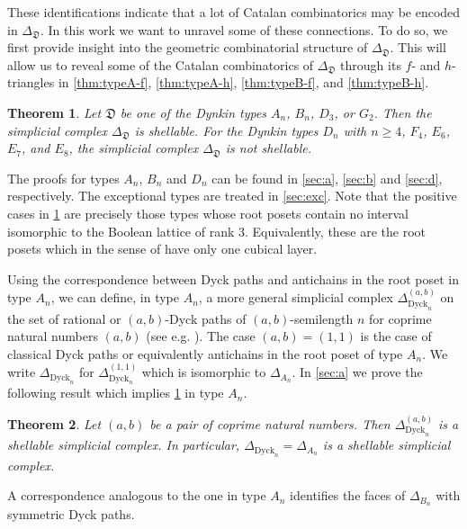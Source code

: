 \documentclass[11pt]{amsart}
\def\Dyck{\mathrm{Dyck}}
\def\fD{\mathfrak{D}}
\theoremstyle{plain}
\numberwithin{lemma}{\DefaultNumberTheoremWithin}
\newtheorem{theorem}{Theorem}
\numberwithin{theorem}{\DefaultNumberTheoremWithin}
\numberwithin{corollary}{\DefaultNumberTheoremWithin}
\numberwithin{proposition}{\DefaultNumberTheoremWithin}
\numberwithin{conjecture}{\DefaultNumberTheoremWithin}
\theoremstyle{definition}
\numberwithin{definition}{\DefaultNumberTheoremWithin}
\numberwithin{question}{\DefaultNumberTheoremWithin}
\numberwithin{problem}{\DefaultNumberTheoremWithin}
\theoremstyle{remark}
\numberwithin{remark}{\DefaultNumberTheoremWithin}
\numberwithin{example}{\DefaultNumberTheoremWithin}
\numberwithin{claim}{\DefaultNumberTheoremWithin}
\begin{document}
These identifications indicate that a lot of Catalan combinatorics may be encoded in $\Delta_\fD$.
In this work we want to unravel some of these connections.
To do so, we first provide insight into the geometric combinatorial structure of 
$\Delta_\fD$. This will allow us to reveal some of the Catalan combinatorics  of $\Delta_\fD$
through its $f$- and $h$-triangles in \ref{thm:typeA-f}, \ref{thm:typeA-h}, \ref{thm:typeB-f}, and \ref{thm:typeB-h}. 

\begin{theorem} \label{thm:antichain}
    Let $\fD$ be one of the Dynkin types $A_n$, $B_n$, $D_3$, or $G_2$. Then the simplicial complex $\Delta_\fD$ is shellable. For the Dynkin types $D_n$ with $n\geq 4$, $F_4$, $E_6$, $E_7$, and $E_8$, the simplicial complex $\Delta_\fD$ is not shellable.
\end{theorem}

The proofs for types $A_n$, $B_n$ and $D_n$ can be found in \ref{sec:a}, \ref{sec:b} and \ref{sec:d}, respectively. The exceptional types are
treated in \ref{sec:exc}. Note that the positive cases in \ref{thm:antichain} are precisely those types whose root posets contain no interval isomorphic to the Boolean lattice of rank $3$. Equivalently, these are the root posets which in the 
sense of \cite{Rin18} have only one cubical layer.

Using the correspondence between Dyck paths and antichains in the root poset in type $A_n$, 
we can define, in type $A_n$, a more general simplicial complex $\Delta_{\Dyck_n}^{(a,b)}$ on the set of
rational or $(a,b)$-Dyck paths of $(a,b)$-semilength $n$
for coprime natural numbers $(a,b)$ (see e.g. \cite{ALW15, BGSX16, CDH16}). 
The case $(a,b)= (1,1)$ is the
case of classical Dyck paths or equivalently antichains in the root poset of type $A_n$.
We write $\Delta_{\Dyck_n}$ for $\Delta_{\Dyck_n}^{(1,1)}$ which is isomorphic to 
$\Delta_{A_n}$. In \ref{sec:a} we prove the following result which implies 
\ref{thm:antichain} in type $A_n$.

\begin{theorem}\label{thm:shellable}
    Let $(a,b)$ be a pair of coprime natural numbers. Then 
    $\Delta_{\Dyck_n}^{(a,b)}$ is a shellable simplicial complex. In particular, 
    $\Delta_{\Dyck_n} = \Delta_{A_n}$ is
    a shellable simplicial complex.
\end{theorem}

A correspondence analogous to the one in type $A_n$ identifies the
faces of $\Delta_{B_n}$ with symmetric Dyck paths. 
\end{document}
